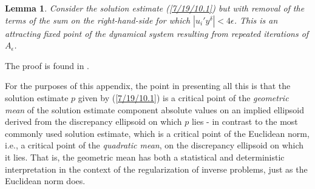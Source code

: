 \documentclass{amsart}
\numberwithin{equation}{section}
\newtheorem{lemma}[theorem]{Lemma}
\theoremstyle{definition}
\numberwithin{theorem}{section}
\begin{document}
{\begin{lemma} \label{7/6/21.9} Consider the solution estimate (\ref{7/19/10.1}) but with removal of the terms of the sum on the right-hand-side for which $|u_i'y^\delta|<4\epsilon$.  This is an attracting fixed point of the dynamical system resulting from repeated iterations of $A_\epsilon$. \end{lemma}

The proof is found in \cite{fgreensite:2022d}.

For the purposes of this appendix, the point in presenting all this is that the solution estimate $p$ given by (\ref{7/19/10.1}) is a critical point of the {\it geometric mean} of the solution estimate component absolute values on an implied ellipsoid  derived from the discrepancy ellipsoid on which $p$ lies - in contrast to the most commonly used solution estimate, which is a critical point of the Euclidean norm, i.e., a critical point of the {\it quadratic mean}, on the discrepancy ellipsoid on which it lies.  That is, the geometric mean has both a statistical and deterministic interpretation in the context of the regularization of inverse problems, just as the Euclidean norm does. 


}
\end{document}
